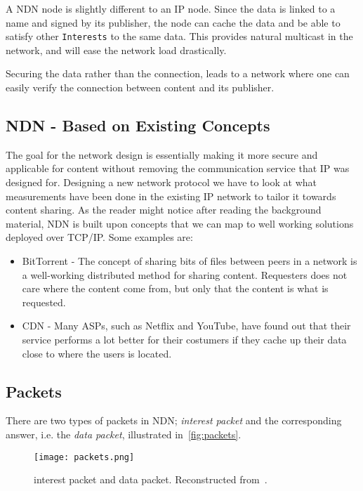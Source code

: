 A \gls{NDN} node is slightly different to an \gls{IP} node. 
Since the \gls{data} is linked to a \gls{name} and signed by its \gls{publisher}, the node can cache the \gls{data} and be able to satisfy other \texttt{Interests} to the same \gls{data}. 
This provides natural \gls{multicast} in the network, and will ease the network load drastically.

Securing the \gls{data} rather than the connection, leads to a network where one can easily verify the connection between content and its \gls{publisher}.

\subsection{NDN - Based on Existing Concepts}
The goal for the network design is essentially making it more secure and applicable for content without removing the communication service that \gls{IP} was designed for. 
Designing a new network protocol we have to look at what measurements have been done in the existing \gls{IP} network to tailor it towards content sharing.
As the reader might notice after reading the background material, \gls{NDN} is built upon concepts that we can map to well working solutions deployed over \gls{TCP}/\gls{IP}.
Some examples are:
\begin{itemize}
  \item BitTorrent - 
  The concept of sharing bits of files between peers in a network is a well-working distributed method for sharing content. 
  Requesters does not care where the content come from, but only that the content is what is requested.
  \item \gls{CDN} - 
  Many \gls{ASP}s, such as Netflix and YouTube, have found out that their service performs a lot better for their costumers if they cache up their data close to where the users is located.
\end{itemize}

\subsection{Packets}\label{packets}
There are two types of packets in \gls{NDN};
\textit{\gls{interest} packet} and the corresponding answer, i.e. the \textit{\gls{data} packet}, illustrated in~\autoref{fig:packets}.

\begin{figure}[H]
  \centering
  \texttt{[image: packets.png]}
  \caption[NDN packets]{\gls{interest} packet and \gls{data} packet.
  Reconstructed from~\cite{jac09-03}.
  }
  \label{fig:packets}
\end{figure}

